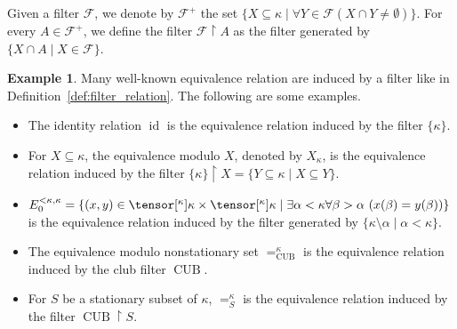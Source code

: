 \documentclass{amsart}
\numberwithin{equation}{section}
\newcommand{\pre}[2]{\tensor[^{#1}]{#2}{}}
\newcommand{\1}{\mathbf{I}}
\newcommand{\2}{\mathbf{II}}
\renewcommand{\k}{\kappa}
\newcommand{\id}{\operatorname{id}}
\DeclareMathOperator{\CUB}{CUB}
\theoremstyle{definition}
\newtheorem{example}[theorem]{Example}
\theoremstyle{remark}
\begin{document}
Given a filter $\mathcal{F}$, we denote by $\mathcal{F}^+$ the set $\{X\subseteq \kappa\mid \forall Y\in \mathcal{F} (X\cap Y\neq \emptyset)\}$. For every $A\in \mathcal{F}^+$, we define the filter $\mathcal{F}\restriction A$ as the filter generated by $\{X\cap A\mid X\in \mathcal{F}\}$.

\begin{example}\label{example_approx}
Many well-known equivalence relation are induced by a filter like in Definition~\ref{def:filter_relation}. The following are some examples. 
\begin{itemize}
    \item The identity relation $\id$ is the equivalence  relation induced by the filter $\{\k\}$. 
    \item For \(X \subseteq \k\), the equivalence modulo $X$, denoted by $X_\k$, is the equivalence relation induced by the filter $\{\k\}\restriction X=\{Y\subseteq \k\mid X\subseteq Y\}$. 
    \item $E_0^{<\kappa,\kappa}=\{(x,y)\in \pre{\k}{\kappa}\times \pre{\k}{\kappa}\mid \exists\alpha<\kappa \forall\beta>\alpha\ (x(\beta)=y(\beta))\}$ is the equivalence relation induced by the filter generated by $\{\k\setminus \alpha \mid \alpha<\k\}$.
    \item The equivalence modulo nonstationary set $=_{\CUB}^\k$ is the equivalence relation induced by the club filter $\CUB$.
    \item For $S$ be a stationary subset of \(\k\), $=_S^\k$ is the equivalence relation induced by the filter $\CUB\restriction S$.
\end{itemize}
\end{example}
\end{document}
